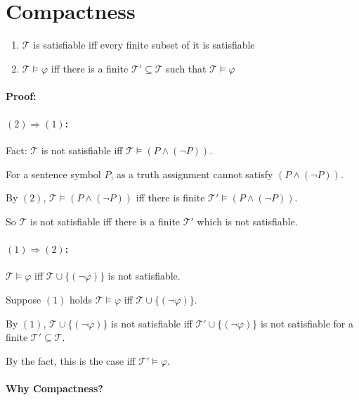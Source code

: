 \documentclass[11pt]{article}
\begin{document}
	\section{Compactness}
	\begin{enumerate}
		\item $\mathcal{T}$ is satisfiable iff every finite subset of it is satisfiable
		\item $\mathcal{T} \models \varphi$ iff there is a finite $\mathcal{T}' \subseteq \mathcal{T}$ such that $\mathcal{T} \models \varphi$
	\end{enumerate}
	
	\paragraph{\textbf{Proof:}}
	
	\paragraph{$(2) \Rightarrow (1)$:}
	
	Fact: $\mathcal{T}$ is not satisfiable iff $\mathcal{T} \models (P \wedge (\neg P))$.
	
	For a sentence symbol $P$, as a truth assignment cannot satisfy $(P \wedge (\neg P))$. 
	
	By $(2)$, $\mathcal{T} \models (P \wedge (\neg P))$ iff there is finite $\mathcal{T}' \models (P \wedge (\neg P))$.
	
	So $\mathcal{T}$ is not satisfiable iff there is a finite $\mathcal{T}'$ which is not satisfiable.
	
	\paragraph{$(1) \Rightarrow (2)$:}
	
	$\mathcal{T} \models \varphi$ iff $\mathcal{T} \cup \{(\neg \varphi)\}$ is not satisfiable.

	Suppose $(1)$ holds $\mathcal{T} \models \varphi$ iff $\mathcal{T} \cup \{(\neg \varphi)\}$.
	
	By $(1)$, $\mathcal{T} \cup \{(\neg \varphi)\}$ is not satisfiable iff $\mathcal{T}' \cup \{(\neg \varphi)\}$ is not satisfiable for a finite $\mathcal{T}' \subseteq \mathcal{T}$.
	
	By the fact, this is the case iff $\mathcal{T}' \models \varphi$.
	
	\paragraph{Why Compactness?}
	
\end{document}
